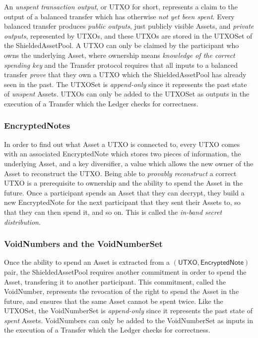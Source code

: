 \documentclass[a4paper]{article}
\newcommand{\lsubsubsection}[2]{\def\sectionlabel{#2} \subsubsection{#1}\label{sec:#2}}
\theoremstyle{definition}
\newcommand{\Asset}{{\textsf{Asset}}}
\newcommand{\EncryptedNote}{{\textsf{EncryptedNote}}}
\newcommand{\Ledger}{{\textsf{Ledger}}}
\newcommand{\ShieldedAssetPool}{{\textsf{ShieldedAssetPool}}}
\newcommand{\Transfer}{{\textsf{Transfer}}}
\newcommand{\UTXOSet}{{\textsf{UTXOSet}}}
\newcommand{\UTXO}{{\textsf{UTXO}}}
\newcommand{\VoidNumberSet}{{\textsf{VoidNumberSet}}}
\newcommand{\VoidNumber}{{\textsf{VoidNumber}}}
\begin{document}
An \emph{unspent transaction output}, or \UTXO{} for short, represents a claim to the output of a balanced transfer which has otherwise \emph{not yet been spent}. Every balanced transfer produces \emph{public outputs}, just publicly visible \Asset{s}, and \emph{private outputs}, represented by \UTXO{s}, and these \UTXO{s} are stored in the \UTXOSet{} of the \ShieldedAssetPool{}. A \UTXO{} can only be claimed by the participant who owns the underlying \Asset{}, where ownership means \emph{knowledge of the correct spending key} and the \Transfer{} protocol requires that all inputs to a balanced transfer \emph{prove} that they own a \UTXO{} which the \ShieldedAssetPool{} has already seen in the past. The \UTXOSet{} is \emph{append-only} since it represents the past state of \emph{unspent} \Asset{s}. \UTXO{s} can only be added to the \UTXOSet{} as outputs in the execution of a \Transfer{} which the \Ledger{} checks for correctness.

\lsubsubsection{\EncryptedNote{s}}{ledger-encrypted-notes}

In order to find out what \Asset{} a \UTXO{} is connected to, every \UTXO{} comes with an associated \EncryptedNote{} which stores two pieces of information, the underlying \Asset{}, and a key diversifier, a value which allows the new owner of the \Asset{} to reconstruct the \UTXO{}. Being able to \emph{provably reconstruct} a correct \UTXO{} is a prerequisite to ownership and the ability to spend the \Asset{} in the future. Once a participant spends an \Asset{} that they can decrypt, they build a new \EncryptedNote{} for the next participant that they sent their \Asset{s} to, so that they can then spend it, and so on. This is called the \emph{in-band secret distribution}.

\lsubsubsection{\VoidNumber{s} and the \VoidNumberSet{}}{ledger-void-number-set}

Once the ability to spend an \Asset{} is extracted from a $(\UTXO, \EncryptedNote)$ pair, the \ShieldedAssetPool{} requires another commitment in order to spend the \Asset{}, transfering it to another participant. This commitment, called the \VoidNumber{}, represents the revocation of the right to spend the \Asset{} in the future, and ensures that the same \Asset{} cannot be spent twice. Like the \UTXOSet{}, the \VoidNumberSet{} is \emph{append-only} since it represents the past state of \emph{spent} \Asset{s}. \VoidNumber{s} can only be added to the \VoidNumberSet{} as inputs in the execution of a \Transfer{} which the \Ledger{} checks for correctness.
\end{document}
